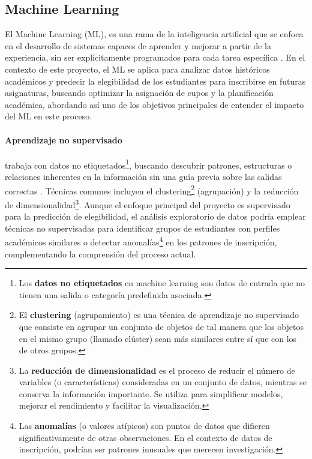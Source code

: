 \subsection{Machine Learning}
El Machine Learning (ML), es una rama de la inteligencia artificial que se enfoca en el desarrollo de sistemas capaces de aprender y mejorar a partir de la experiencia, sin ser explícitamente programados para cada tarea específica \parencite{Samuel1959}.
En el contexto de este proyecto, el ML se aplica para analizar datos históricos académicos y predecir la elegibilidad de los estudiantes para inscribirse en futuras asignaturas, buscando optimizar la asignación de cupos y la planificación académica, abordando así uno de los objetivos principales de entender el impacto del ML en este proceso.

\paragraph{Aprendizaje no supervisado}
trabaja con datos no etiquetados\footnote{Los \textbf{datos no etiquetados} en machine learning son datos de entrada que no tienen una salida o categoría predefinida asociada.}, buscando descubrir patrones, estructuras o relaciones inherentes en la información sin una guía previa sobre las salidas correctas \parencite{Hastie2009}.
Técnicas comunes incluyen el clustering\footnote{El \textbf{clustering} (agrupamiento) es una técnica de aprendizaje no supervisado que consiste en agrupar un conjunto de objetos de tal manera que los objetos en el mismo grupo (llamado clúster) sean más similares entre sí que con los de otros grupos.} (agrupación) y la reducción de dimensionalidad\footnote{La \textbf{reducción de dimensionalidad} es el proceso de reducir el número de variables (o características) consideradas en un conjunto de datos, mientras se conserva la información importante.
Se utiliza para simplificar modelos, mejorar el rendimiento y facilitar la visualización.}.
Aunque el enfoque principal del proyecto es supervisado para la predicción de elegibilidad, el análisis exploratorio de datos podría emplear técnicas no supervisadas para identificar grupos de estudiantes con perfiles académicos similares o detectar anomalías\footnote{Las \textbf{anomalías} (o valores atípicos) son puntos de datos que difieren significativamente de otras observaciones.
En el contexto de datos de inscripción, podrían ser patrones inusuales que merecen investigación.} en los patrones de inscripción, complementando la comprensión del proceso actual.

